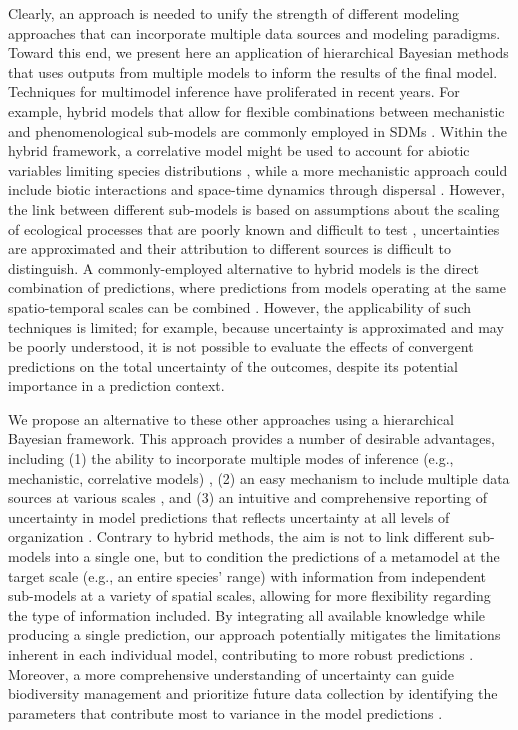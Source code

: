 \documentclass[11pt]{article}
\begin{document}
Clearly, an approach is needed to unify the strength of different modeling approaches that can incorporate multiple data sources and modeling paradigms.
Toward this end, we present here an application of hierarchical Bayesian methods that uses outputs from multiple models to inform the results of the final model.
Techniques for multimodel inference have proliferated in recent years.
For example, hybrid models that allow for flexible combinations between mechanistic and phenomenological sub-models are commonly employed in SDMs \citep{Gallien2010, Thuiller2013, Boulangeat2014}.
Within the hybrid framework, a correlative model might be used to account for abiotic variables limiting species distributions \citep{Guisan2005}, while a more mechanistic approach could include biotic interactions and space-time dynamics through dispersal \citep{Smolik2010}.
However, the link between different sub-models is based on assumptions about the scaling of ecological processes that are poorly known and difficult to test \citep{Gallien2010}, uncertainties are approximated and their attribution to different sources is difficult to distinguish.
A commonly-employed alternative to hybrid models is the direct combination of predictions, where predictions from models operating at the same spatio-temporal scales can be combined \citep[e.g., model averaging, ensemble forecasting;][]{Araujo2007}. 
However, the applicability of such techniques is limited; for example, because uncertainty is approximated and may be poorly understood, it is not possible to evaluate the effects of convergent predictions on the total uncertainty of the outcomes, despite its potential importance in a prediction context.

We propose an alternative to these other approaches using a hierarchical Bayesian framework. 
This approach provides a number of desirable advantages, including (1) the ability to incorporate multiple modes of inference (e.g., mechanistic, correlative models) \citep{VanOijen2005, Clark2006, Hobbs2011, Hartig2012}, (2) an easy mechanism to include multiple data sources at various scales \citep{Levin1992, Peters2004}, and (3) an intuitive and comprehensive reporting of uncertainty in model predictions that reflects uncertainty at all levels of organization \citep{Cressie2009, Hobbs2011}.
Contrary to hybrid methods, the aim is not to link different sub-models into a single one, but to condition the predictions of a metamodel at the target scale (e.g., an entire species' range) with information from independent sub-models at a variety of spatial scales, allowing for more flexibility regarding the type of information included. 
By integrating all available knowledge while producing a single prediction, our approach potentially mitigates the limitations inherent in each individual model, contributing to more robust predictions \citep{Guisan2005, Araujo2006}.
Moreover, a more comprehensive understanding of uncertainty can guide biodiversity management and prioritize future data collection by identifying the parameters that contribute most to variance in the model predictions \citep{McMahon2011}. 
\end{document}
